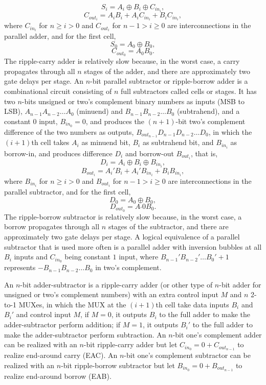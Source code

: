\documentclass[a4paper,12pt]{article}
\begin{document}
\begin{itemize}
\begin{itemize}
\begin{itemize}
\begin{itemize}
\begin{itemize}
\begin{itemize}
\begin{itemize}
\[S_i=A_i\oplus B_i\oplus C_{in_i},\]
\[C_{out_i}=A_iB_i+A_iC_{in_i}+B_iC_{in_i},\]
where $C_{in_i}$ for $n\geq i>0$ and $C_{out_i}$ for $n-1>i\geq 0$ are interconnections in the parallel adder, and for the first cell,
\[S_0=A_0\oplus B_0,\]
\[C_{out_0}=A_0B_0.\]
The ripple-carry adder is relatively slow because, in the worst case, a carry propagates through all $n$ stages of the adder, and there are approximately two gate delays per stage.
An $n$-bit parallel subtractor or ripple-borrow adder is a combinational circuit consisting of $n$ full subtractors called cells or stages. It has two $n$-bits unsigned or two's complement binary numbers as inputs (MSB to LSB), $A_{n-1}A_{n-2}\ldots A_0$ (minuend) and $B_{n-1}B_{n-2}\ldots B_0$ (subtrahend), and a constant $0$ input, $B_{in_0}=0$, and produces the $(n+1)$-bit two's complement difference of the two numbers as outputs, $B_{out_{n-1}}D_{n-1}D_{n-2}\ldots D_0$, in which the $(i+1)$th cell takes $A_i$ as minuend bit, $B_i$ as subtrahend bit, and $B_{in_i}$ as borrow-in, and produces difference $D_i$ and borrow-out $B_{out_i}$, that is,
\[D_i=A_i\oplus B_i\oplus B_{in_i},\]
\[B_{out_i}=A_i'B_i+A_i'B_{in_i}+B_iB_{in_i},\]
where $B_{in_i}$ for $n\geq i>0$ and $B_{out_i}$ for $n-1>i\geq 0$ are interconnections in the parallel subtractor, and for the first cell,
\[D_0=A_0\oplus B_0,\]
\[D_{out_0}=A_'0B_0.\]
The ripple-borrow subtractor is relatively slow because, in the worst case, a borrow propagates through all $n$ stages of the subtractor, and there are approximately two gate delays per stage.
A logical equivalence of a parallel subtractor that is used more often is a parallel adder with inversion bubbles at all $B_i$ inputs and $C_{in_0}$ being constant $1$ input, where $B_{n-1}'B_{n-2}'\ldots B_0'+1$ represents $-B_{n-1}B_{n-2}\ldots B_0$ in two's complement.

An $n$-bit adder-subtractor is a ripple-carry adder (or other type of $n$-bit adder for unsigned or two's complement numbers) with an extra control input $M$ and $n$ 2-to-1 MUXes, in which the MUX at the $(i+1)$th cell take data inputs $B_i$ and $B_i'$ and control input $M$, if $M=0$, it outputs $B_i$ to the full adder to make the adder-subtractor perform addition; if $M=1$, it outputs $B_i'$ to the full adder to make the adder-subtractor perform subtraction.
An $n$-bit one's complement adder can be realized with an $n$-bit ripple-carry adder but let $C_{in_0}=0+C_{out_{n-1}}$ to realize end-around carry (EAC).
An $n$-bit one's complement subtractor can be realized with an $n$-bit ripple-borrow subtractor but let $B_{in_0}=0+B_{out_{n-1}}$ to realize end-around borrow (EAB).


\end{itemize}
\end{itemize}
\end{itemize}
\end{itemize}
\end{itemize}
\end{itemize}
\end{itemize}
\end{document}

